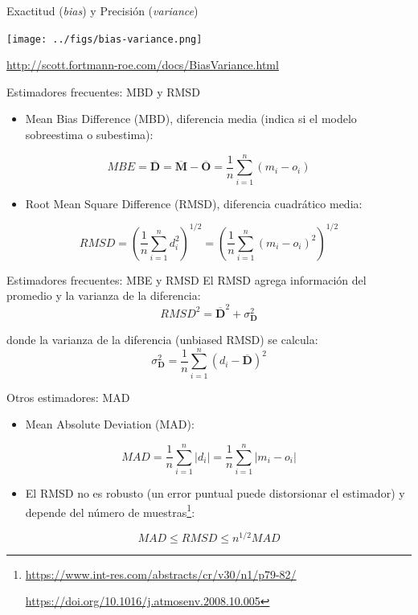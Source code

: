 \documentclass[aspectratio=169, usenames,svgnames,dvipsnames]{beamer}
\begin{document}
\begin{frame}[label={sec:org59f2a3d}]{Exactitud (\emph{bias}) y Precisión (\emph{variance})}
\begin{center}
\texttt{[image: ../figs/bias-variance.png]}
\end{center}

\url{http://scott.fortmann-roe.com/docs/BiasVariance.html}
\end{frame}

\begin{frame}[label={sec:org1a5a35b}]{Estimadores frecuentes: MBD y RMSD}
\begin{itemize}
\item Mean Bias Difference (MBD), diferencia media (indica si el modelo sobreestima o subestima):
\end{itemize}
\[
MBE = \overline{\mathbf{D}} = \overline{\mathbf{M}} - \overline{\mathbf{O}} = \frac{1}{n} \sum_{i=1}^n (m_i - o_i)
\]

\begin{itemize}
\item Root Mean Square Difference (RMSD), diferencia cuadrático media:
\end{itemize}
\[
RMSD = \left(\frac{1}{n} \sum_{i=1}^n d_i^2 \right)^{1/2} =  \left( \frac{1}{n} \sum_{i=1}^n (m_i - o_i)^2  \right)^{1/2}
\]
\end{frame}

\begin{frame}[label={sec:org0fc8b5a}]{Estimadores frecuentes: MBE y RMSD}
El RMSD agrega información del promedio y la varianza de la
  diferencia:
\[
RMSD^2= \overline{\mathbf{D}}^2 + \sigma^2_{\mathbf{D}} 
\]

donde la varianza de la diferencia (unbiased RMSD) se calcula:
\[
\sigma^2_{\mathbf{D}} = \frac{1}{n} \sum_{i=1}^n (d_i - \overline{\mathbf{D}})^2
\]
\end{frame}


\begin{frame}[label={sec:org58e28be}]{Otros estimadores: MAD}
\begin{itemize}
\item Mean Absolute Deviation (MAD):
\end{itemize}

\[
MAD = \frac{1}{n} \sum_{i=1}^n \left|d_i\right| =  \frac{1}{n} \sum_{i=1}^n \left|m_i - o_i\right|
\]
\begin{itemize}
\item El RMSD no es robusto (un error puntual puede distorsionar el estimador) y depende del número de muestras\footnote{\url{https://www.int-res.com/abstracts/cr/v30/n1/p79-82/}

\url{https://doi.org/10.1016/j.atmosenv.2008.10.005}}:
\end{itemize}
\[
MAD \leq RMSD \leq n^{1/2} MAD
\]
\end{frame}
\end{document}
